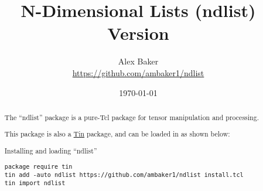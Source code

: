 \documentclass{article}
\title{\Huge{N-Dimensional Lists (ndlist)}\\\large Version \version}
\author{Alex Baker\\\small\url{https://github.com/ambaker1/ndlist}}
\date{\small\today}
\begin{document}
\maketitle
\begin{abstract}
\begin{center}
The ``ndlist'' package is a pure-Tcl package for tensor manipulation and processing.

This package is also a \textcolor{blue}{\href{https://github.com/ambaker1/Tin}{Tin}} package, and can be loaded in as shown below:
\end{center}
\begin{example}{Installing and loading ``ndlist''}
\begin{lstlisting}
package require tin
tin add -auto ndlist https://github.com/ambaker1/ndlist install.tcl
tin import ndlist
\end{lstlisting}
\end{example}
\end{abstract}
\clearpage








\printindex
\end{document}
